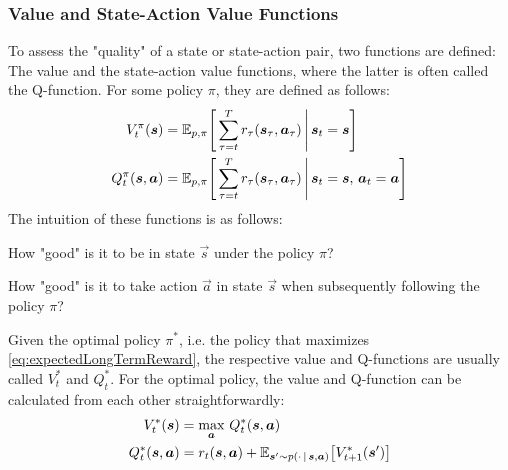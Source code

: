 			\subsubsection{Value and State-Action Value Functions}
				To assess the "quality" of a state or state-action pair, two functions are defined: The value and the state-action value functions, where the latter is often called the Q-function. For some policy \(\pi\), they are defined as follows:
				\begin{align*}
					V_t^\pi(\bm{s})          &= \mathbb{E}_{p, \pi}\Bigg[ \sum_{\tau = t}^{T} r_\tau(\bm{s}_\tau, \bm{a}_\tau) \,\Bigg\vert\, \bm{s}_t = \bm{s} \Bigg]                        \\
					Q_t^\pi(\bm{s}, \bm{a}) &= \mathbb{E}_{p, \pi}\Bigg[ \sum_{\tau = t}^{T} r_\tau(\bm{s}_\tau, \bm{a}_\tau) \,\Bigg\vert\, \bm{s}_t = \bm{s},\, \bm{a}_t = \bm{a} \Bigg]
				\end{align*}
				The intuition of these functions is as follows:
				\begin{description}[leftmargin = 3.5cm]
					\item[Value Function] How "good" is it to be in state \( \vec{s} \) under the policy \(\pi\)?
					\item[Q-Function]     How "good" is it to take action \( \vec{a} \) in state \( \vec{s} \) when subsequently following the policy \(\pi\)?
				\end{description}
				Given the optimal policy \( \pi^\ast \), i.e. the policy that maximizes \eqref{eq:expectedLongTermReward}, the respective value and Q-functions are usually called \( V_t^\ast \) and \( Q_t^\ast \). For the optimal policy, the value and Q-function can be calculated from each other straightforwardly:
				\begin{equation*}
					\begin{aligned}
						V_t^\ast(\bm{s})          &= \max_{\bm{a}} \, Q_t^\ast(\bm{s}, \bm{a}) \\
						Q_t^\ast(\bm{s}, \bm{a}) &= r_t(\bm{s}, \bm{a}) + \mathbb{E}_{\bm{s}' \sim p(\cdot \,\vert\, \bm{s}, \bm{a})}\big[ V_{t + 1}^\ast(\bm{s}') \big]
					\end{aligned}  \label{eq:valueQFuncRelations}
				\end{equation*}

